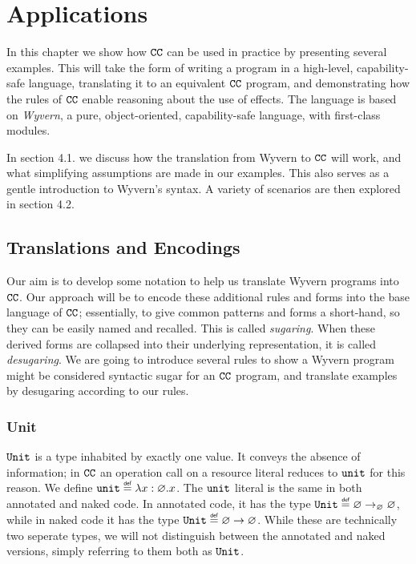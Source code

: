 
\chapter{Applications}

In this chapter we show how $\mathtt{CC}$ can be used in practice by presenting several examples. This will take the form of writing a program in a high-level, capability-safe language, translating it to an equivalent $\mathtt{CC}$ program, and demonstrating how the rules of $\mathtt{CC}$ enable reasoning about the use of effects. The language is based on \textit{Wyvern}, a pure, object-oriented, capability-safe language, with first-class modules.

In section 4.1. we discuss how the translation from Wyvern to $\mathtt{CC}$ will work, and what simplifying assumptions are made in our examples. This also serves as a gentle introduction to Wyvern's syntax. A variety of scenarios are then explored in section 4.2.

\section{Translations and Encodings}

Our aim is to develop some notation to help us translate Wyvern programs into $\mathtt{CC}$. Our approach will be to encode these additional rules and forms into the base language of $\mathtt{CC}$; essentially, to give common patterns and forms a short-hand, so they can be easily named and recalled. This is called \textit{sugaring}. When these derived forms are collapsed into their underlying representation, it is called \textit{desugaring}. We are going to introduce several rules to show a Wyvern program might be considered syntactic sugar for an $\mathtt{CC}$ program, and translate examples by desugaring according to our rules.

\subsection{Unit}

$\mathtt{Unit}$ is a type inhabited by exactly one value. It conveys the absence of information; in $\mathtt{CC}$ an operation call on a resource literal reduces to $\mathtt{unit}$ for this reason. We define $\unit \defn \lambda x: \varnothing. x$. The $\mathtt{unit}$ literal is the same in both annotated and naked code. In annotated code, it has the type $\Unit \defn \varnothing \rightarrow_{\varnothing} \varnothing$, while in naked code it has the type $\Unit \defn \varnothing \rightarrow \varnothing$. While these are technically two seperate types, we will not distinguish between the annotated and naked versions, simply referring to them both as $\mathtt{Unit}$.


